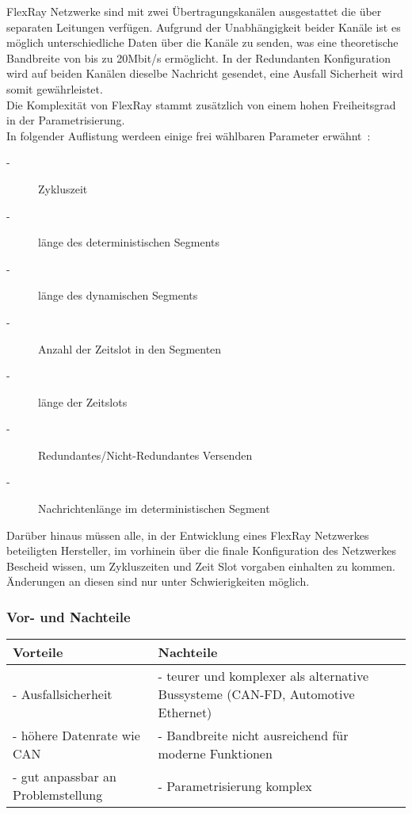     FlexRay Netzwerke sind mit zwei Übertragungskanälen ausgestattet die über separaten Leitungen 
    verfügen. Aufgrund der Unabhängigkeit beider Kanäle ist es möglich unterschiedliche Daten über
    die Kanäle zu senden, was eine theoretische Bandbreite von bis zu 20Mbit/s ermöglicht. 
    In der Redundanten Konfiguration wird auf beiden Kanälen dieselbe Nachricht gesendet, eine 
    Ausfall Sicherheit wird somit gewährleistet.~\cite{LA_FR3}\\
    
    Die Komplexität von FlexRay stammt zusätzlich von einem hohen Freiheitsgrad in der
    Parametrisierung.\\
    In folgender Auflistung werdeen einige frei wählbaren Parameter erwähnt~\cite{LA_FR2}:
    \begin{description}
    \item[-] Zykluszeit
    \item[-] länge des deterministischen Segments
    \item[-] länge des dynamischen Segments
    \item[-] Anzahl der Zeitslot in den Segmenten
    \item[-] länge der Zeitslots
    \item[-] Redundantes/Nicht-Redundantes Versenden
    \item[-] Nachrichtenlänge im deterministischen Segment
    \end{description}

    Darüber hinaus müssen alle, in der Entwicklung eines FlexRay Netzwerkes beteiligten Hersteller, im 
    vorhinein über die finale Konfiguration des Netzwerkes Bescheid wissen, um Zykluszeiten und 
    Zeit Slot vorgaben einhalten zu kommen. Änderungen an diesen sind nur unter Schwierigkeiten möglich.


    \subsubsection{Vor- und Nachteile}
    \begin{center}
        \begin{tabular}{p{5.5cm} p{5.5cm}}
            \hline
            Vorteile & Nachteile\\
            \hline
            \hline - Ausfallsicherheit & - teurer und komplexer als alternative Bussysteme (CAN-FD, Automotive Ethernet)\\
            \hline - höhere Datenrate wie CAN &  - Bandbreite nicht ausreichend für moderne Funktionen\\
            \hline - gut anpassbar an Problemstellung & - Parametrisierung komplex\\
            \hline
        \end{tabular}            
    \end{center}

